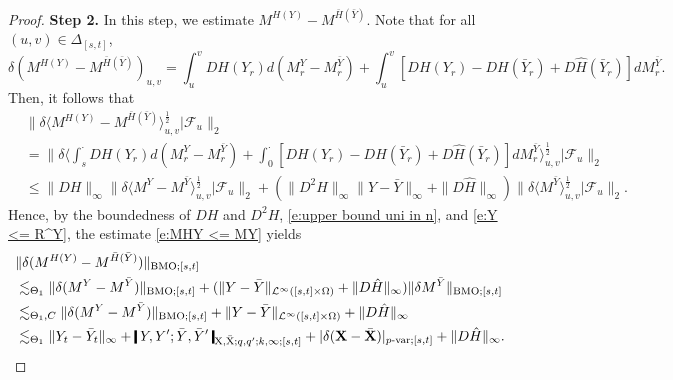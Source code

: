 \documentclass[11pt,reqno]{amsart}
\numberwithin{equation}{section}
\newcommand{\shortthickbar}{%
  \vcenter{\hbox{\rule{1.8pt}{2.2ex}}}%
}
\newcommand{\thicknm}[1]{%
  \mathopen{\shortthickbar}%
  \mkern4mu #1 \mkern4mu%
  \mathclose{\shortthickbar}%
}
\begin{document}
\begin{proof}
{\bf Step 2.} In this step,  we estimate $M^{H(Y)} - M^{\bar H(\bar Y)}$.  Note that for all $(u,v) \in \Delta_{[s,t]}$, 
\begin{equation*}
\delta (M^{H(Y)} - M^{\bar H(\bar Y)})_{u,v} = \int_{u}^{v} DH(Y_r) d (M^{Y}_r - M^{\bar Y}_r) + \int_{u}^{v} [DH(Y_r) - DH(\bar Y_r) + D\hat H (\bar Y_r)] dM^{\bar Y}_r. 
\end{equation*}
Then, it follows that  
\begin{equation}\label{e:MHY <= MY}
\begin{aligned} 
&\big\| \delta \big\langle M^{H(Y)} - M^{\bar H(\bar Y)} \big\rangle^{\frac{1}{2}}_{u,v} \big| \mathcal F_{u} \big\|_{2} \\ 
&= \Big\| \delta \Big\langle \int_s^{\bm\cdot} DH(Y_r) d (M^{Y}_r - M^{\bar Y}_r) + \int_0^{\bm\cdot} [DH(Y_r) - DH(\bar Y_r) + D\hat H(\bar Y_r)] dM^{\bar Y}_r \Big\rangle^{\frac{1}{2}}_{u,v} \Big| \mathcal F_{u} \Big\|_{2}\\ 
&\le \|DH\|_{\infty} \big\| \delta \big\langle M^{Y} - M^{\bar Y} \big\rangle^{\frac{1}{2}}_{u,v} \big| \mathcal F_{u}\big\|_{2} + (\|D^2 H\|_{\infty} \|Y - \bar Y\|_{\infty} + \|D\hat H\|_{\infty}) \big\| \delta \big\langle M^{\bar Y} \big\rangle_{u,v}^{\frac{1}{2}} \big| \mathcal F_{u} \big\|_2.
\end{aligned}
\end{equation}
Hence, by the boundedness of $D H$ and $D^2 H$, \eqref{e:upper bound uni in n}, and \eqref{e:Y <= R^Y}, the estimate \eqref{e:MHY <= MY} yields 
\begin{equation}\label{e:M^H^n - M^H^m}
\begin{aligned}
&\|\delta (M^{H(Y)} - M^{\bar H(\bar Y)})\|_{\mathrm{BMO};[s,t]}\\ 
&\lesssim_{\Theta_1} \|\delta (M^{Y} - M^{\bar Y})\|_{\mathrm{BMO};[s,t]} + (\|Y - \bar Y\|_{\mathcal L^{\infty}([s,t] \times \Omega)} + \|D\hat H\|_{\infty}) \|\delta M^{\bar Y}\|_{\mathrm{BMO};[s,t]}\\ 
&\lesssim_{\Theta_{1},C} \|\delta (M^{Y} - M^{\bar Y})\|_{\mathrm{BMO};[s,t]} + \|Y - \bar Y\|_{\mathcal L^{\infty}([s,t] \times \Omega)} + \|D\hat H\|_{\infty}\\
&\lesssim_{\Theta_1} \|Y_t - \bar Y_t\|_{\infty} + \thicknm{Y ,Y'; \bar Y, \bar Y'}_{\mathrm X,\bar{\mathrm X};q,q';k,\infty;[s,t]} + |\delta (\mathbf X - \bar{\mathbf X} )|_{p\text{-}\mathrm{var};[s,t]} + \|D\hat H\|_{\infty}.
\end{aligned}
\end{equation}


\end{proof}
\end{document}
